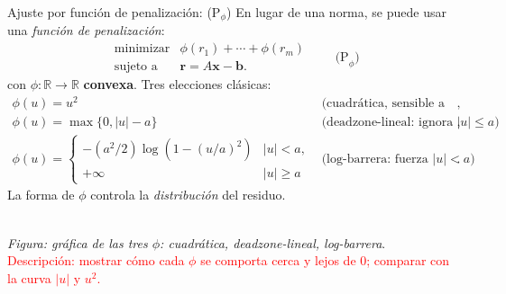 \documentclass[10pt,aspectratio=169]{beamer}
\newcommand{\R}{\mathbb{R}}
\newcommand{\x}{\mathbf{x}}
\newcommand{\xb}{\mathbf{b}}
\newcommand{\0}{\mathbf{0}}
\newcommand{\1}{\mathbf{1}}
\newcommand{\res}{\mathbf{r}}
\begin{document}
\begin{frame}{Ajuste por función de penalización: (P$_\phi$)}
  En lugar de una norma, se puede usar una \emph{función de penalización}:
  \[
    \begin{array}{ll}
      \text{minimizar} & \phi(r_1) + \cdots + \phi(r_m) \\
      \text{sujeto a}  & \res = A\x - \xb.
    \end{array}
    \qquad\text{(P}_\phi\text{)}
  \]
  con $\phi:\R\to\R$ \textbf{convexa}. Tres elecciones clásicas:
  \[
    \begin{array}{ll}
      \phi(u)=u^2            & \text{(cuadrática, sensible a outliers)}, \\[0.3em]
      \phi(u)=\max\{0,|u|-a\} & \text{(deadzone-lineal: ignora $|u|\le a$)},\\[0.3em]
      \phi(u)=\begin{cases}
                  -(a^2/2)\log(1-(u/a)^2) & |u|<a, \\
                  +\infty                 & |u|\ge a
              \end{cases} & \text{(log-barrera: fuerza $|u|<a$)}.
    \end{array}
  \]
  La forma de $\phi$ controla la \emph{distribución} del residuo.

\begin{center}
    \\[2pt]
    {\footnotesize \emph{Figura: gráfica de las tres $\phi$: cuadrática, deadzone-lineal, log-barrera}.}\\
    {\footnotesize \textcolor{red}{Descripción: mostrar cómo cada $\phi$ se comporta cerca y lejos de $0$; comparar con la curva $|u|$ y $u^2$.}}
  \end{center}
\end{frame}

\end{document}
